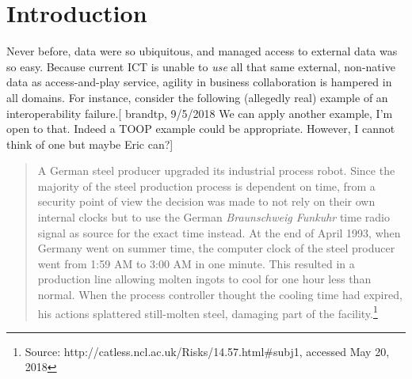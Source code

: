 \documentclass[a4paper,11pt,oneside,oldfontcommands]{memoir}
\theoremstyle{definition}
\theoremstyle{break}		%
\numberwithin{equation}{chapter}
\numberwithin{figure}{chapter}
\begin{document}



%





\hypertarget{introduction}{%
\chapter{Introduction}\label{introduction}}

Never before, data were so ubiquitous, and managed access to external
data was so easy. Because current ICT is unable to \emph{use} all that
same external, non-native data as access-and-play service, agility in
business collaboration is hampered in all domains. For instance,
consider the following (allegedly real) example of an interoperability
failure.{[} brandtp, 9/5/2018 We can apply another example, I'm open to
that. Indeed a TOOP example could be appropriate. However, I cannot
think of one but maybe Eric can?{]}

\begin{quote}
A German steel producer upgraded its industrial process robot. Since the
majority of the steel production process is dependent on time, from a
security point of view the decision was made to not rely on their own
internal clocks but to use the German \emph{Braunschweig Funkuhr} time
radio signal as source for the exact time instead. At the end of April
1993, when Germany went on summer time, the computer clock of the steel
producer went from 1:59 AM to 3:00 AM in one minute. This resulted in a
production line allowing molten ingots to cool for one hour less than
normal. When the process controller thought the cooling time had
expired, his actions splattered still-molten steel, damaging part of the
facility.\footnote{Source:
  http://catless.ncl.ac.uk/Risks/14.57.html\#subj1, accessed May 20,
  2018}
\end{quote}
\end{document}
